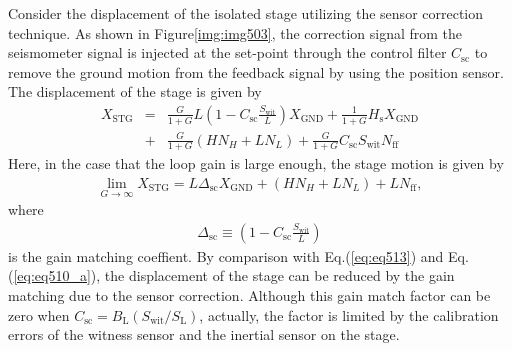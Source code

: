 Consider the displacement of the isolated stage utilizing the sensor correction technique. As shown in Figure\ref{img:img503}, the correction signal from the seismometer signal is injected at the set-point through the control filter $C_{\mathrm{sc}}$ to remove the ground motion from the feedback signal by using the position sensor. The displacement of the stage is given by 
\begin{eqnarray}\nonumber
  X_{\mathrm{STG}} &=&\frac{G}{1+G}L\left(1-C_{\mathrm{sc}}\frac{S_{\mathrm{wit}}}{L}\right) X_{\mathrm{GND}} + \frac{1}{1+G}H_{\mathrm{s}}X_{\mathrm{GND}}\\ 
  &+& \frac{G}{1+G}\left(HN_{H}+LN_{L}\right) + \frac{G}{1+G}C_{\mathrm{sc}}S_{\mathrm{wit}}N_{\mathrm{ff}} \label{eq:eq511}
\end{eqnarray}
Here, in the case that the loop gain is large enough, the stage motion is given by 
\begin{eqnarray}
  \lim_{G\to\infty} X_{\mathrm{STG}} = L\Delta_{\mathrm{sc}} X_{\mathrm{GND}} + \left(HN_{H}+LN_{L}\right) + {L}N_{\mathrm{ff}} \label{eq:eq513},
\end{eqnarray}
where 
\begin{eqnarray}
  \Delta_{\mathrm{sc}} \equiv \left(1-C_{\mathrm{sc}}\frac{S_{\mathrm{wit}}}{L}\right) \label{eq:eq512}
\end{eqnarray}
is the gain matching coeffient. By comparison with Eq.(\ref{eq:eq513}) and Eq.(\ref{eq:eq510_a}), the displacement of the stage can be reduced by the gain matching due to the sensor correction. Although this gain match factor can be zero when $C_{\mathrm{sc}}=B_{\mathrm{L}}(S_{\mathrm{wit}}/S_{\mathrm{L}})$, actually, the factor is limited by the calibration errors of the witness sensor and the inertial sensor on the stage. 

